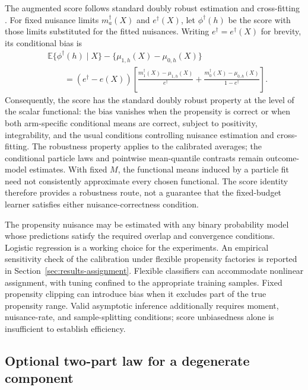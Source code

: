 \documentclass[11pt]{article}
\begin{document}
The augmented score follows standard doubly robust estimation and cross-fitting \citep{bang2005doubly,chernozhukov2018double}. For fixed nuisance limits $m_a^\dagger(X)$ and $e^\dagger(X)$, let $\phi^\dagger(h)$ be the score with those limits substituted for the fitted nuisances. Writing $e^\dagger=e^\dagger(X)$ for brevity, its conditional bias is
\[
 \begin{aligned}
 &\mathbb{E}\{\phi^\dagger(h)\mid X\}-\{\mu_{1,h}(X)-\mu_{0,h}(X)\}\\
 &\qquad=(e^\dagger-e(X))\left[
 \frac{m_1^\dagger(X)-\mu_{1,h}(X)}{e^\dagger}
 +\frac{m_0^\dagger(X)-\mu_{0,h}(X)}{1-e^\dagger}
 \right].
 \end{aligned}
\]
Consequently, the score has the standard doubly robust property at the level
of the scalar functional: the bias vanishes when the propensity is correct or
when both arm-specific conditional means are correct, subject to positivity,
integrability, and the usual conditions controlling nuisance estimation and
cross-fitting. The robustness property applies to the calibrated averages; the conditional particle laws and pointwise mean-quantile contrasts remain outcome-model estimates. With fixed $M$, the functional means induced by a particle fit need not consistently approximate every chosen functional. The score identity therefore provides a robustness route, not a guarantee that the fixed-budget learner satisfies either nuisance-correctness condition.

The propensity nuisance may be estimated with any binary probability model whose predictions satisfy the required overlap and convergence conditions. Logistic regression is a working choice for the experiments. An empirical sensitivity check of the calibration under flexible propensity factories is reported in Section~\ref{sec:results-assignment}. Flexible classifiers can accommodate nonlinear assignment, with tuning confined to the appropriate training samples. Fixed propensity clipping can introduce bias when it excludes part of the true propensity range. Valid asymptotic inference additionally requires moment, nuisance-rate, and sample-splitting conditions; score unbiasedness alone is insufficient to establish efficiency.

\subsection{Optional two-part law for a degenerate component}\label{sec:zipt}
\end{document}
